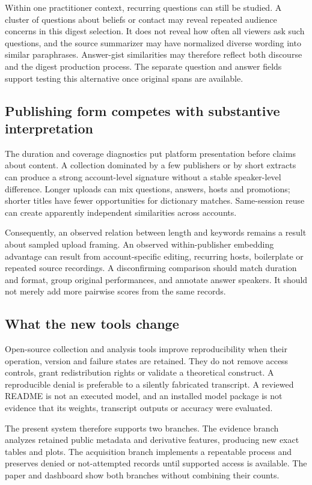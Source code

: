 Within one practitioner context, recurring questions can still be studied. A cluster of questions about beliefs or contact may reveal repeated audience concerns in this digest selection. It does not reveal how often all viewers ask such questions, and the source summarizer may have normalized diverse wording into similar paraphrases. Answer-gist similarities may therefore reflect both discourse and the digest production process. The separate question and answer fields support testing this alternative once original spans are available.

\subsection{Publishing form competes with substantive interpretation}
The duration and coverage diagnostics put platform presentation before claims about content. A collection dominated by a few publishers or by short extracts can produce a strong account-level signature without a stable speaker-level difference. Longer uploads can mix questions, answers, hosts and promotions; shorter titles have fewer opportunities for dictionary matches. Same-session reuse can create apparently independent similarities across accounts.

Consequently, an observed relation between length and keywords remains a result about sampled upload framing. An observed within-publisher embedding advantage can result from account-specific editing, recurring hosts, boilerplate or repeated source recordings. A disconfirming comparison should match duration and format, group original performances, and annotate answer speakers. It should not merely add more pairwise scores from the same records.

\subsection{What the new tools change}
Open-source collection and analysis tools improve reproducibility when their operation, version and failure states are retained. They do not remove access controls, grant redistribution rights or validate a theoretical construct. A reproducible denial is preferable to a silently fabricated transcript. A reviewed README is not an executed model, and an installed model package is not evidence that its weights, transcript outputs or accuracy were evaluated.

The present system therefore supports two branches. The evidence branch analyzes retained public metadata and derivative features, producing new exact tables and plots. The acquisition branch implements a repeatable process and preserves denied or not-attempted records until supported access is available. The paper and dashboard show both branches without combining their counts.

